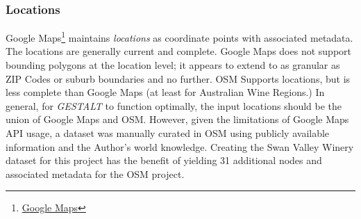 \subsubsection{Locations}
Google Maps\footnote{\href{https://www.google.com/maps/about/}{Google Maps}} maintains \textit{locations} as coordinate points with associated metadata. The locations are generally current and complete. 
Google Maps does not support bounding polygons at the location level; it appears to extend to as granular as ZIP Codes or suburb boundaries and no further. 
OSM Supports locations, but is less complete than Google Maps (at least for Australian Wine Regions.)
In general, for \textit{GESTALT} to function optimally, the input locations should be the union of Google Maps and OSM. However, given the limitations of Google Maps API usage, a dataset was manually curated in OSM using publicly available information and the Author's world knowledge. 
Creating the Swan Valley Winery dataset for this project has the benefit of yielding 31 additional nodes and associated metadata for the OSM project. 

